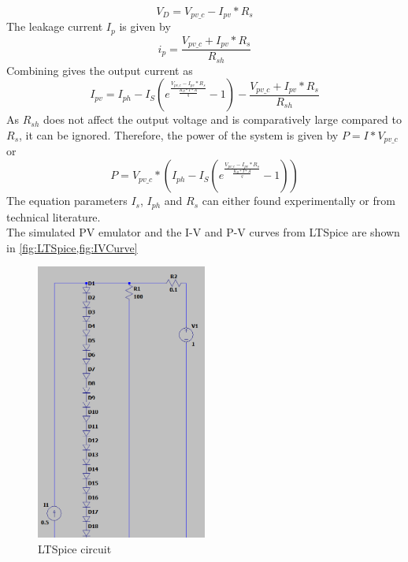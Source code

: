 \documentclass[]{article}
\begin{document}
        \begin{equation}\label{eq:DiodeVoltage}
            V_D=V_{pv\_c}-I_{pv}*R_s
        \end{equation}
        The leakage current $I_p$ is given by
        \begin{equation}\label{eq:LeakageCurrent}
            i_p=\frac{V_{pv\_c}+I_{pv}*R_s}{R_{sh}}
        \end{equation}
        Combining  gives the output current as
        \begin{equation}
            I_{pv}=I_{ph}-I_S(e^\frac{V_{pv\_c}-I_{pv}*R_s}{\frac{K_B*T*A}{q}}-1)-\frac{V_{pv\_c}+I_{pv}*R_s}{R_{sh}}
        \end{equation}
        As $R_{sh}$ does not affect the output voltage and is comparatively large compared to $R_s$, it can be ignored. Therefore, the power of the system is given by $P=I*V_{pv\_c}$ or
        \begin{equation}
            P=V_{pv\_c}*(I_{ph}-I_S(e^\frac{V_{pv\_c}-I_{pv}*R_s}{\frac{K_B*T*A}{q}}-1))
        \end{equation}
        The equation parameters $I_s$, $I_{ph}$ and $R_s$ can either found experimentally or from technical literature.
        \\
        The simulated PV emulator and the I-V and P-V curves from LTSpice are shown in \cref{fig:LTSpice,fig:IVCurve}
        \begin{figure}[H]
        	\centering
        	\includegraphics[width=0.5\textwidth]{LTSpice_cropped}
        	\caption{LTSpice circuit}
        	\label{fig:LTSpice}
        \end{figure}
\end{document}
